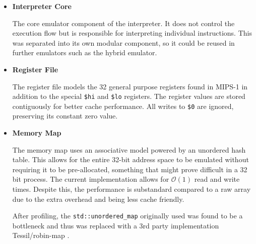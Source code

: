 \begin{itemize}
    \item \textbf{Interpreter Core}
    
    The core emulator component of the interpreter. It does not control the execution flow but is responsible for interpreting individual instructions. This was separated into its own modular component, so it could be reused in further emulators such as the hybrid emulator.

    \item \textbf{Register File}

    The register file models the 32 general purpose registers found in MIPS-1 in addition to the special \texttt{\$hi} and \texttt{\$lo} registers. The register values are stored contiguously for better cache performance. All writes to \texttt{\$0} are ignored, preserving its constant zero value.

    \item \textbf{Memory Map}

    The memory map uses an associative model powered by an unordered hash table. This allows for the entire 32-bit address space to be emulated without requiring it to be pre-allocated, something that might prove difficult in a 32 bit process. The current implementation allows for $\mathcal{O}(1)$ read and write times. Despite this, the performance is substandard compared to a raw array due to the extra overhead and being less cache friendly.

    After profiling, the \texttt{std::unordered\_map} originally used was found to be a bottleneck and thus was replaced with a 3rd party implementation Tessil/robin-map \cite{tessil-map, tessil-benchmark}.

\end{itemize}